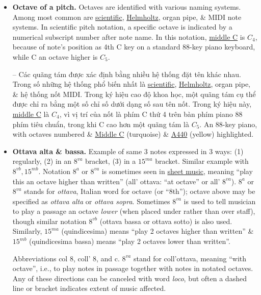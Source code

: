 \documentclass{article}
\begin{document}
\begin{itemize}
	\item {\bf Octave of a pitch.} Octaves are identified with various naming systems. Among most common are \href{https://en.wikipedia.org/wiki/Scientific_pitch_notation}{scientific}, \href{https://en.wikipedia.org/wiki/Helmholtz_pitch_notation}{Helmholtz}, organ pipe, \& MIDI note systems. In scientific pitch notation, a specific octave is indicated by a numerical subscript number after note name. In this notation, \href{https://en.wikipedia.org/wiki/Middle_C}{middle C} is $C_4$, because of note's position as 4th C key on a standard 88-key piano keyboard, while C an octave higher is $C_5$.
	
	-- Các quãng tám được xác định bằng nhiều hệ thống đặt tên khác nhau. Trong số những hệ thống phổ biến nhất là \href{https://en.wikipedia.org/wiki/Scientific_pitch_notation}{scientific}, \href{https://en.wikipedia.org/wiki/Helmholtz_pitch_notation}{Helmholtz}, organ pipe, \& hệ thống nốt MIDI. Trong ký hiệu cao độ khoa học, một quãng tám cụ thể được chỉ ra bằng một số chỉ số dưới dạng số sau tên nốt. Trong ký hiệu này, \href{https://en.wikipedia.org/wiki/Middle_C}{middle C} là $C_4$, vì vị trí của nốt là phím C thứ 4 trên bàn phím piano 88 phím tiêu chuẩn, trong khi C cao hơn một quãng tám là $C_5$. {\sf An 88-key piano, with octaves numbered \& \href{https://en.wikipedia.org/wiki/C_(musical_note)#Middle_C}{Middle C} (turquoise) \& \href{https://en.wikipedia.org/wiki/A440_(pitch_standard)}{A440} (yellow) highlighted.}
	\item {\bf Ottava alta \& bassa.} {\sf Example of same 3 notes expressed in 3 ways: (1) regularly, (2) in an $8^{va}$ bracket, (3) in a $15^{ma}$ bracket. Similar example with $8^{vb},15^{mb}$.} Notation $8^a$ or $8^{va}$ is sometimes seen in \href{https://en.wikipedia.org/wiki/Sheet_music}{sheet music}, meaning ``play this an octave higher than written'' (all' ottava: ``at octave'' or all' $8^{va}$). $8^a$ or $8^{va}$ stands for {\it ottava}, Italian word for octave (or ``8th''); octave above may be specified as {\it ottava alta} or {\it ottava sopra}. Sometimes $8^{va}$ is used to tell musician to play a passage an octave {\it lower} (when placed under rather than over staff), though similar notation $8^{vb}$ (ottava bassa or ottava sotto) is also used. Similarly, \href{https://en.wikipedia.org/wiki/Fifteenth}{$15^{ma}$} (quindicesima) means ``play 2 octaves higher than written'' \& $15^{mb}$ (quindicesima bassa) means ``play 2 octaves lower than written''.
	
	Abbreviations col 8, coll' 8, and c. $8^{va}$ stand for coll'ottava, meaning ``with octave'', i.e., to play notes in passage together with notes in notated octaves. Any of these directions can be canceled with word {\it loco}, but often a dashed line or bracket indicates extent of music affected.
\end{itemize}
\end{document}

